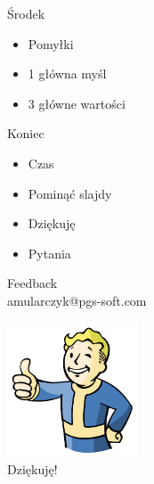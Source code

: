 \documentclass{beamer}
\begin{document}
\begin{frame}{}
	\begin{center}
		\Huge{Środek}
	\end{center}
\end{frame}

\begin{frame}{}
	\begin{Large}
		\begin{itemize}
			\item Pomyłki
			\item 1 główna myśl
			\item 3 główne wartości
		\end{itemize}
	\end{Large}
\end{frame}

\begin{frame}{}
	\begin{center}
		\Huge{Koniec}
	\end{center}
\end{frame}

\begin{frame}{}
	\begin{Large}
		\begin{itemize}
			\item Czas
			\item Pominąć slajdy
			\item Dziękuję
			\item Pytania
		\end{itemize}
	\end{Large}
\end{frame}

\begin{frame}{}
	\begin{center}
		\Huge{Feedback}\\
		\Large{amularczyk@pgs-soft.com}
	\end{center}
\end{frame}

\begin{frame}{}
	\begin{center}
  		\includegraphics[height=4cm]{ok.png} \\
		\Huge{Dziękuję!}
	\end{center}
\end{frame}
\end{document}
